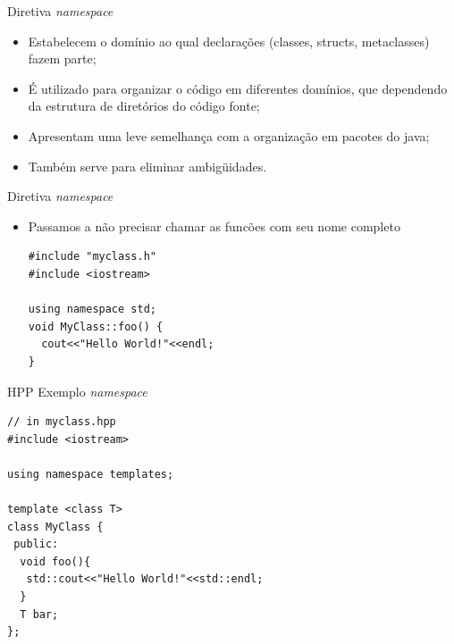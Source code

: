 \documentclass[12pt,table,xcolor={dvipsnames}]{beamer}
\begin{document}
\begin{frame}[fragile]{Diretiva \textit{namespace}}
\begin{itemize}
\item Estabelecem o domínio ao qual declarações (classes, structs, metaclasses) fazem parte;
\item É utilizado para organizar o código em diferentes domínios, que dependendo da
estrutura de diretórios do código fonte; 
\item Apresentam uma leve semelhança com a organização em pacotes do java;
\item Também serve para eliminar ambigüidades.
\end{itemize}
\end{frame}

\begin{frame}[fragile]{Diretiva \textit{namespace}}
\begin{itemize}
\begin{lstlisting}
#include "myclass.h"
#include <iostream>
void MyClass::foo() {
  std::cout<<"Hello World!"<<std::endl;
}\end{lstlisting}
\item Passamos a não precisar chamar as funcões com seu nome completo
\begin{lstlisting}
#include "myclass.h"
#include <iostream>

using namespace std;
void MyClass::foo() {
  cout<<"Hello World!"<<endl;
}
\end{lstlisting}

\end{itemize}
\end{frame}

\begin{frame}[fragile]{HPP Exemplo \textit{namespace}}
\begin{lstlisting}
// in myclass.hpp
#include <iostream>

using namespace templates;

template <class T>
class MyClass {
 public:
  void foo(){
   std::cout<<"Hello World!"<<std::endl;
  }
  T bar;
};
\end{lstlisting}
\end{frame}
\end{document}
